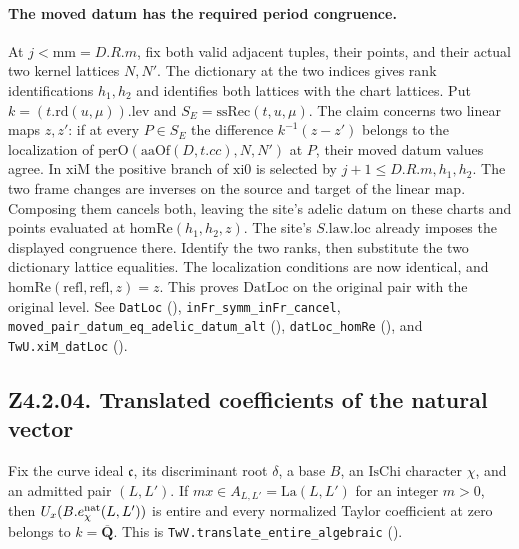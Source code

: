 \paragraph{The moved datum has the required period congruence.}
\label{r15:datum}
At $j<\mathrm{mm}=D.R.m$, fix both valid adjacent tuples, their points,
and their actual two kernel lattices $N,N'$. The dictionary at the two
indices gives rank identifications $h_1,h_2$ and identifies both lattices
with the chart lattices. Put $k=(t.\mathrm{rd}(u,\mu)).\mathrm{lev}$ and
$S_E=\mathrm{ssRec}(t,u,\mu)$. The claim concerns two linear maps $z,z'$:
if at every $P\in S_E$ the difference
$k^{-1}(z-z')$ belongs to the localization of
$\mathrm{perO}(\mathrm{aaOf}(D,t.cc),N,N')$ at $P$, their moved
datum values agree. In $\mathrm{xiM}$ the positive branch of
$\mathrm{xi0}$ is selected by $j+1\le D.R.m,h_1,h_2$.
The two frame changes are inverses on the source and target of the
linear map. Composing them cancels both, leaving the site's adelic
datum on these charts and points evaluated at $\mathrm{homRe}(h_1,h_2,z)$.
The site's $S.\mathrm{law.loc}$ already imposes the displayed congruence
there. Identify the two ranks, then substitute the two dictionary lattice
equalities. The localization conditions are now identical, and
$\mathrm{homRe}(\mathrm{refl},\mathrm{refl},z)=z$. This proves
$\mathrm{DatLoc}$ on the original pair with the original level.
See \nolinkurl{DatLoc} (),
\nolinkurl{inFr_symm_inFr_cancel}, \nolinkurl{moved_pair_datum_eq_adelic_datum_alt}
(),
\nolinkurl{datLoc_homRe} (),
and \nolinkurl{TwU.xiM_datLoc}
().

\subsection{Z4.2.04. Translated coefficients of the natural vector}
\label{r15:translated}
Fix the curve ideal $\mathfrak c$, its discriminant root $\delta$, a base $B$,
an $\mathrm{IsChi}$ character $\chi$, and an admitted pair $(L,L')$. If
$m x\in A_{L,L'}=\mathrm{La}(L,L')$ for an integer $m>0$, then
$U_x(B.e^{\rm nat}_\chi(L,L'))$ is entire and every normalized Taylor
coefficient at zero belongs to $k=\overline{\mathbf Q}$.
This is \nolinkurl{TwV.translate_entire_algebraic}
().

